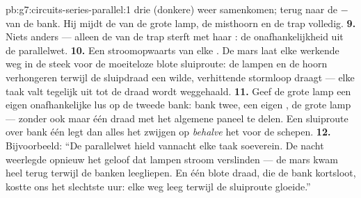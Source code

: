 \begin{solution}{pb:g7:circuits-series-parallel:1}
drie (donkere)  weer samenkomen; terug naar de $-$ van de
bank. Hij mijdt de  van de grote lamp, de misthoorn en de trap
volledig.
\textbf{9.} Niets anders --- alleen de  van de trap sterft met
haar : de onafhankelijkheid uit de parallelwet.
\textbf{10.} Een  stroomopwaarts van elke . De
mars laat elke werkende weg in de steek voor de moeiteloze blote
sluiproute: de lampen en de hoorn verhongeren terwijl de sluipdraad
een wilde, verhittende stormloop draagt --- elke taak valt tegelijk
uit tot de draad wordt weggehaald.
\textbf{11.} Geef de grote lamp een eigen onafhankelijke lus op de
tweede bank: bank twee, een eigen , de grote lamp --- zonder
ook maar één draad met het algemene paneel te delen. Een sluiproute
over bank één legt dan alles het zwijgen op \emph{behalve} het
 voor de schepen.
\textbf{12.} Bijvoorbeeld: ``De parallelwet hield vannacht elke taak
soeverein. De nacht weerlegde opnieuw het geloof dat lampen stroom
verslinden --- de mars kwam heel terug terwijl de banken leegliepen.
En één blote draad, die de bank kortsloot, kostte ons het slechtste
uur: elke weg leeg terwijl de sluiproute gloeide.''
\end{solution}
